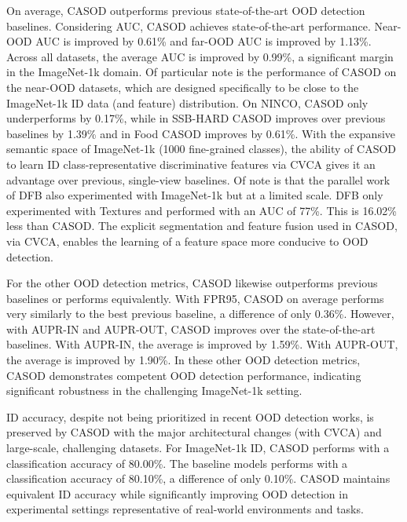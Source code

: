 On average, CASOD outperforms previous state-of-the-art OOD detection baselines. Considering AUC, CASOD achieves state-of-the-art performance. Near-OOD AUC is improved by 0.61\% and far-OOD AUC is improved by 1.13\%. Across all datasets, the average AUC is improved by 0.99\%, a significant margin in the ImageNet-1k domain. Of particular note is the performance of CASOD on the near-OOD datasets, which are designed specifically to be close to the ImageNet-1k ID data (and feature) distribution. On NINCO, CASOD only underperforms by 0.17\%, while in SSB-HARD CASOD improves over previous baselines by 1.39\% and in Food CASOD improves by 0.61\%. With the expansive semantic space of ImageNet-1k (1000 fine-grained classes), the ability of CASOD to learn ID class-representative discriminative features via CVCA gives it an advantage over previous, single-view baselines. Of note is that the parallel work of DFB \cite{ding2024improving} also experimented with ImageNet-1k but at a limited scale. DFB only experimented with Textures and performed with an AUC of 77\%. This is 16.02\% less than CASOD. The explicit segmentation and feature fusion used in CASOD, via CVCA, enables the learning of a feature space more conducive to OOD detection.

For the other OOD detection metrics, CASOD likewise outperforms previous baselines or performs equivalently. With FPR95, CASOD on average performs very similarly to the best previous baseline, a difference of only 0.36\%. However, with AUPR-IN and AUPR-OUT, CASOD improves over the state-of-the-art baselines. With AUPR-IN, the average is improved by 1.59\%. With AUPR-OUT, the average is improved by 1.90\%. In these other OOD detection metrics, CASOD demonstrates competent OOD detection performance, indicating significant robustness in the challenging ImageNet-1k setting.

ID accuracy, despite not being prioritized in recent OOD detection works, is preserved by CASOD with the major architectural changes (with CVCA) and large-scale, challenging datasets. For ImageNet-1k ID, CASOD performs with a classification accuracy of 80.00\%. The baseline models performs with a classification accuracy of 80.10\%, a difference of only 0.10\%. CASOD maintains equivalent ID accuracy while significantly improving OOD detection in experimental settings representative of real-world environments and tasks.
